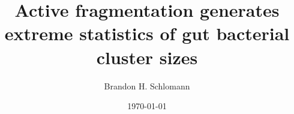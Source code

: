 \documentclass[aps,pre,twocolumn]{revtex4-1}
\begin{document}
\title{Active fragmentation generates extreme statistics of gut bacterial cluster sizes}
\author{Brandon H. Schlomann}
\date{\today}

\end{document}
